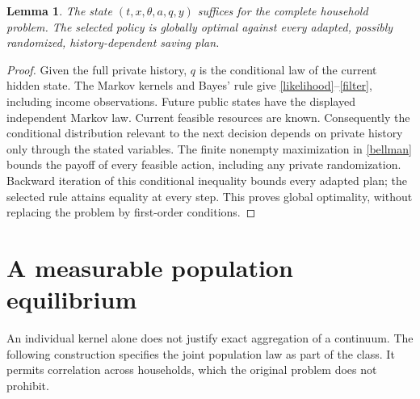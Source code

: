 \documentclass[11pt]{article}
\newtheorem{lemma}{Lemma}
\begin{document}
\begin{lemma}\label{individual}
The state $(t,x,\theta,a,q,y)$ suffices for the complete household problem. The selected policy is globally optimal against every adapted, possibly randomized, history-dependent saving plan.
\end{lemma}
\begin{proof}
Given the full private history, $q$ is the conditional law of the current hidden state. The Markov kernels and Bayes' rule give \eqref{likelihood}--\eqref{filter}, including income observations. Future public states have the displayed independent Markov law. Current feasible resources are known. Consequently the conditional distribution relevant to the next decision depends on private history only through the stated variables. The finite nonempty maximization in \eqref{bellman} bounds the payoff of every feasible action, including any private randomization. Backward iteration of this conditional inequality bounds every adapted plan; the selected rule attains equality at every step. This proves global optimality, without replacing the problem by first-order conditions.
\end{proof}

\section{A measurable population equilibrium}
An individual kernel alone does not justify exact aggregation of a continuum. The following construction specifies the joint population law as part of the class. It permits correlation across households, which the original problem does not prohibit.
\end{document}

